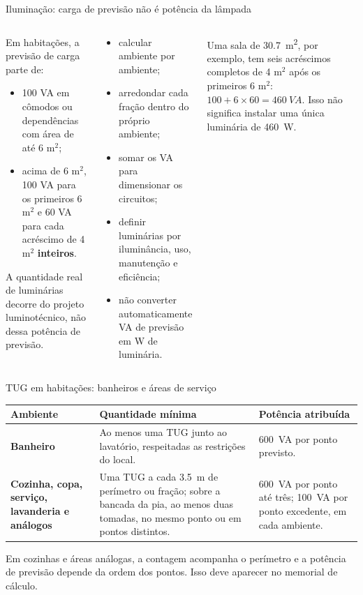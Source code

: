 \begin{frame}[shrink=12]{Iluminação: carga de previsão não é potência da lâmpada}
\small
\begin{columns}[T,onlytextwidth]
\begin{caixaNorma}[title=Previsão mínima de iluminação]
Em habitações, a previsão de carga parte de:
\begin{itemize}
\item 100 VA em cômodos ou dependências com área de até 6 m$^2$;
\item acima de 6 m$^2$, 100 VA para os primeiros 6 m$^2$ e 60 VA para cada acréscimo de 4 m$^2$ \textbf{inteiros}.
\end{itemize}
A quantidade real de luminárias decorre do projeto luminotécnico, não dessa potência de previsão.
\end{caixaNorma}
\begin{caixaProjeto}[title=Aplicação correta]
\begin{itemize}
\item calcular ambiente por ambiente;
\item arredondar cada fração dentro do próprio ambiente;
\item somar os VA para dimensionar os circuitos;
\item definir luminárias por iluminância, uso, manutenção e eficiência;
\item não converter automaticamente VA de previsão em W de luminária.
\end{itemize}
\end{caixaProjeto}
\begin{caixaAt}
Uma sala de \SI{30.7}{m^2}, por exemplo, tem seis acréscimos completos de 4 m$^2$ após os primeiros 6 m$^2$: $100+6\times60=\SI{460}{VA}$. Isso não significa instalar uma única luminária de \SI{460}{W}.
\end{caixaAt}
\end{columns}
\end{frame}

\begin{frame}{TUG em habitações: banheiros e áreas de serviço}
\scriptsize
\begin{tabularx}{\textwidth}{>{\bfseries}p{3.0cm}p{4.45cm}X}
\toprule
Ambiente & Quantidade mínima & Potência atribuída \\
\midrule
Banheiro & Ao menos uma TUG junto ao lavatório, respeitadas as restrições do local. & \SI{600}{VA} por ponto previsto. \\
Cozinha, copa, serviço, lavanderia e análogos & Uma TUG a cada \SI{3.5}{m} de perímetro ou fração; sobre a bancada da pia, ao menos duas tomadas, no mesmo ponto ou em pontos distintos. & \SI{600}{VA} por ponto até três; \SI{100}{VA} por ponto excedente, em cada ambiente. \\
\bottomrule
\end{tabularx}
\begin{caixaAt}
Em cozinhas e áreas análogas, a contagem acompanha o perímetro e a potência de previsão depende da ordem dos pontos. Isso deve aparecer no memorial de cálculo.
\end{caixaAt}
\end{frame}

